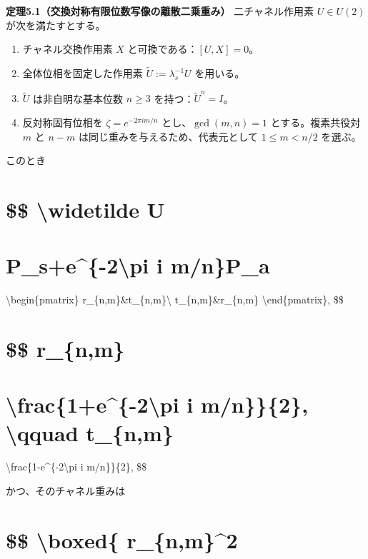 \documentclass[
  a4paper,
  10pt]{article}
\providecommand{\tightlist}{%
  \setlength{\itemsep}{0pt}\setlength{\parskip}{0pt}}
\begin{document}
\textbf{定理5.1（交換対称有限位数写像の離散二乗重み）} 二チャネル作用素
\(U\in U(2)\) が次を満たすとする。

\begin{enumerate}
\def\labelenumi{\arabic{enumi}.}
\tightlist
\item
  チャネル交換作用素 \(X\) と可換である：\([U,X]=0\)。
\item
  全体位相を固定した作用素 \(\widetilde U:=\lambda_s^{-1}U\) を用いる。
\item
  \(\widetilde U\) は非自明な基本位数 \(n\ge3\)
  を持つ：\(\widetilde U^n=I\)。
\item
  反対称固有位相を \(\zeta=e^{-2\pi i m/n}\) とし、\(\gcd(m,n)=1\)
  とする。複素共役対 \(m\) と \(n-m\)
  は同じ重みを与えるため、代表元として \(1\le m<n/2\) を選ぶ。
\end{enumerate}

このとき

\section{\$\$ \textbackslash widetilde U}\label{-widetilde-u}

\section{P\_s+e\^{}\{-2\textbackslash pi i
m/n\}P\_a}\label{p_se-2pi-i-mnp_a}

\textbackslash begin\{pmatrix\} r\_\{n,m\}\&t\_\{n,m\}\textbackslash{}
t\_\{n,m\}\&r\_\{n,m\} \textbackslash end\{pmatrix\}, \$\$

\section{\$\$ r\_\{n,m\}}\label{-r_nm}

\section{\textbackslash frac\{1+e\^{}\{-2\textbackslash pi i
m/n\}\}\{2\}, \textbackslash qquad
t\_\{n,m\}}\label{frac1e-2pi-i-mn2-qquad-t_nm}

\textbackslash frac\{1-e\^{}\{-2\textbackslash pi i m/n\}\}\{2\}, \$\$

かつ、そのチャネル重みは

\section{\$\$ \textbackslash boxed\{
\textbar r\_\{n,m\}\textbar\^{}2}\label{-boxed-r_nm2}
\end{document}
